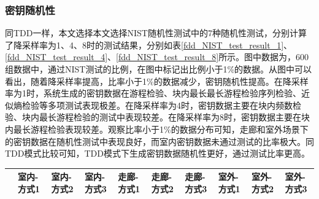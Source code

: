 \documentclass[master]{seuthesis} %
\begin{document}
\begin{Main}
\begin{table}[]
    \centering
    \caption{不同场景的图像熵值
    \label{fdd_entropy_fft2d}}
\end{table}


\subsubsection{密钥随机性}

同TDD一样，本文选择本文选择NIST随机性测试中的7种随机性测试，分别计算了降采样率为1、4、8时的测试结果，分别如表\ref{fdd_NIST_test_result_1}、\ref{fdd_NIST_test_result_4}、\ref{fdd_NIST_test_result_8}所示。图中数据为，600组数据中，通过NIST测试的比例，在图中标记出比例小于1\%的数据。从图中可以看出，随着降采样率提高，比率小于1\%的数据减少，密钥随机性提高。在降采样率为1时，系统生成的密钥数据在游程检验、块内最长最长游程检验序列检验、近似熵检验等多项测试表现极差。在降采样率为4时，密钥数据主要在块内频数检验、块内最长游程检验的测试中表现较差。在降采样率为8时，密钥数据主要在块内最长游程检验表现较差。观察比率小于1\%的数据分布可知，走廊和室外场景下的密钥数据在随机性测试中表现良好，而室内密钥数据未通过测试的比率极大。同TDD模式比较可知，TDD模式下生成密钥数据随机性更好，通过测试比率更高。


\begin{table}[]
    \centering
    \tabulinesep=1.2mm
    \begin{tabu}to \linewidth{X[c,m]X[c,m]X[c,m]X[c,m]X[c,m]X[c,m]X[c,m]X[c,m]X[c,m]X[c,m]}
        \toprule
        \textbf{} & \textbf{室内-方式1} & \textbf{室内-方式2} & \textbf{室内-方式3} & \textbf{走廊-方式1} & \textbf{走廊-方式2} & \textbf{走廊-方式3} & 
        \textbf{室外-方式1} & \textbf{室外-方式2} & \textbf{室外-方式3} \\
        \midrule


\end{tabu}
\end{table}
\end{Main}
\end{document}
